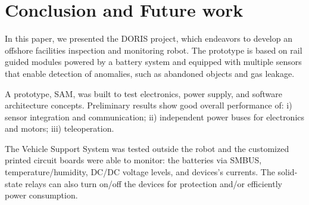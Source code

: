 \documentclass{ifacconf}
\begin{document}
\section{Conclusion and Future work}\label{sec:conclusions}

In this paper, we presented the DORIS project, which endeavors to develop an
offshore facilities inspection and monitoring robot. The prototype is based on
rail guided modules powered by a battery system and equipped with multiple
sensors that enable detection of anomalies, such as abandoned objects and gas
leakage.

A prototype, SAM, was built to test electronics, power
supply, and software architecture concepts.
Preliminary results show good overall performance of: i) sensor integration and communication; ii) independent power buses for
electronics and motors; iii) teleoperation.


The Vehicle Support System was tested outside the robot and the customized
printed circuit boards were able to monitor: the batteries via SMBUS,
temperature/humidity, DC/DC voltage levels, and devices's currents. The
solid-state relays can also turn on/off the devices for protection and/or
efficiently power consumption.
\end{document}
